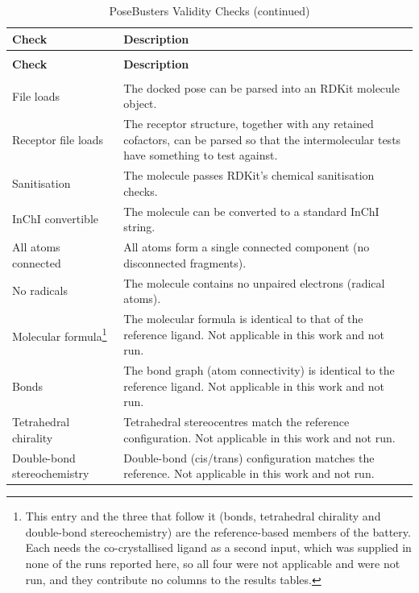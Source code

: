 \begin{longtable}[]{@{}
  >{\raggedright\arraybackslash}p{}
  >{\raggedright\arraybackslash}p{}@{}}
\caption[PoseBusters Validity Checks]{PoseBusters Validity Checks}\label{tab:appendix-posebusters-checks}\tabularnewline
\toprule\noalign{}
{\raggedright \textbf{Check}} & {\raggedright \textbf{Description}} \\
\midrule\noalign{}
\endfirsthead
\caption[]{PoseBusters Validity Checks (continued)}\tabularnewline
\toprule\noalign{}
{\raggedright \textbf{Check}} & {\raggedright \textbf{Description}} \\
\midrule\noalign{}
\endhead
\bottomrule\noalign{}
\endlastfoot
\multicolumn{2}{@{}l@{}}{%
\textbf{Chemical validity and consistency}} \\
File loads & The docked pose can be parsed into an RDKit molecule object. \\
Receptor file loads & The receptor structure, together with any retained cofactors, can be parsed so that the intermolecular tests have something to test against. \\
Sanitisation & The molecule passes RDKit's chemical sanitisation checks. \\
InChI convertible & The molecule can be converted to a standard InChI string. \\
All atoms connected & All atoms form a single connected component (no disconnected fragments). \\
No radicals & The molecule contains no unpaired electrons (radical atoms). \\
Molecular formula\footnote{This entry and the three that follow it (bonds, tetrahedral chirality and double-bond stereochemistry) are the reference-based members of the battery. Each needs the co-crystallised ligand as a second input, which was supplied in none of the runs reported here, so all four were not applicable and were not run, and they contribute no columns to the results tables.} & The molecular formula is identical to that of the reference ligand. Not applicable in this work and not run. \\
Bonds & The bond graph (atom connectivity) is identical to the reference ligand. Not applicable in this work and not run. \\
Tetrahedral chirality & Tetrahedral stereocentres match the reference configuration. Not applicable in this work and not run. \\
Double-bond stereochemistry & Double-bond (cis/trans) configuration matches the reference. Not applicable in this work and not run. \\

\end{longtable}
